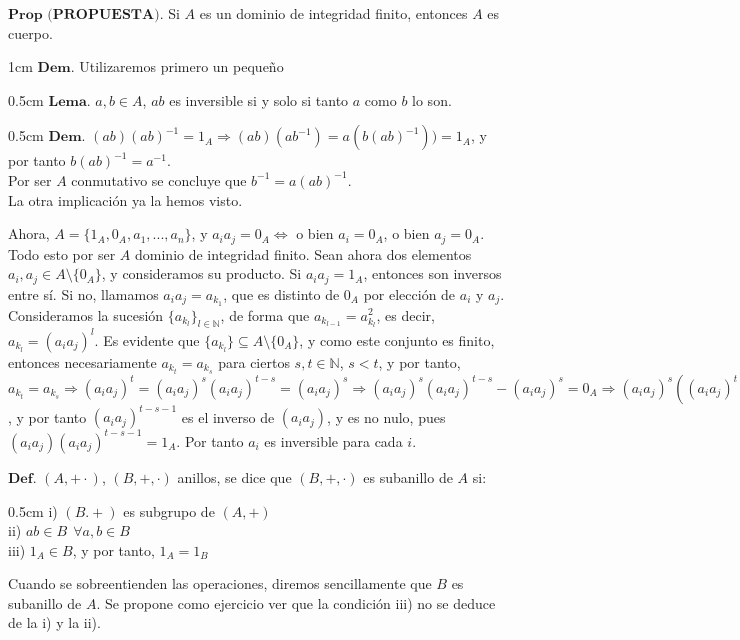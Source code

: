 \documentclass{article}
\begin{document}
$\textbf{Prop (PROPUESTA).}$ Si $A$ es un dominio de integridad finito, entonces $A$ es cuerpo.
\begin{adjustwidth}{1cm}{}
    $\textbf{Dem.}$
    Utilizaremos primero un pequeño
    \begin{adjustwidth}{0.5cm}{}
        $\textbf{Lema.}$ $a, b\in A$, $ab$ es inversible si y solo si tanto $a$ como $b$ lo son.
        \begin{adjustwidth}{0.5cm}{}
            $\textbf{Dem.}$ $(ab)(ab)^{-1} = 1_A \Longrightarrow (ab)(ab^{-1}) = a(b(ab)^{-1})) = 1_A$, y por tanto $b(ab)^{-1} = a^{-1}$.\\
            Por ser $A$ conmutativo se concluye que $b^{-1} = a(ab)^{-1}$.\\
            La otra implicación ya la hemos visto.
        \end{adjustwidth}
    \end{adjustwidth}

    Ahora, $A = \{1_A, 0_A, a_1, ..., a_n \} $, y $a_ia_j = 0_A  \Longleftrightarrow $ o bien $a_i = 0_A$, o bien $a_j = 0_A$. Todo esto por ser $A$ dominio de integridad finito. Sean ahora dos elementos $a_i, a_j \in A\setminus \{0_A\}$, y consideramos su producto. Si $a_ia_j = 1_A$, entonces son inversos entre sí. Si no, llamamos $a_ia_j = a_{k_1}$, que es distinto de $0_A$ por elección de $a_i$ y $a_j$. Consideramos la sucesión $\{ a_{k_l} \}_{l \in \mathbb{N}}$, de forma que $a_{k_{l-1}} = a_{k_l}^2$, es decir, $a_{k_l} = (a_ia_j)^l$. Es evidente que $\{ a_{k_l} \} \subseteq A\setminus \{0_A\}$, y como este conjunto es finito, entonces necesariamente $a_{k_t} = a_{k_s}$ para ciertos $s,t \in \mathbb{N}$, $s<t$, y por tanto, $a_{k_t} = a_{k_s} \Longrightarrow (a_ia_j)^t = (a_ia_j)^s(a_ia_j)^{t-s} = (a_ia_j)^s \Longrightarrow (a_ia_j)^s(a_ia_j)^{t-s} - (a_ia_j)^s = 0_A \Longrightarrow (a_ia_j)^s((a_ia_j)^{t-s} - 1_A) = 0_A \Longrightarrow (a_ia_j)^{t-s} - 1_A = 0_A \Longrightarrow (a_ia_j)^{t-s} = 1_A \Longrightarrow (a_ia_j)(a_ia_j)^{t-s-1} = 1_A$, y por tanto $(a_ia_j)^{t-s-1}$ es el inverso de $(a_ia_j)$, y es no nulo, pues $(a_ia_j)(a_ia_j)^{t-s-1} = 1_A$. Por tanto $a_i$ es inversible para cada $i$.\\

\end{adjustwidth}

$\textbf{Def.}$ $(A, + \cdot)$, $(B, + , \cdot)$ anillos, se dice que $(B, + , \cdot)$ es subanillo de $A$ si:
\begin{adjustwidth}{0.5cm}{}
    i) $(B. +)$ es subgrupo de $(A, +)$\\
    ii) $ab\in B \ \ \forall a,b \in B$\\
    iii) $1_A \in B$, y por tanto, $1_A = 1_B$
\end{adjustwidth}
Cuando se sobreentienden las operaciones, diremos sencillamente que $B$ es subanillo de $A$. Se propone como ejercicio ver que la condición iii) no se deduce de la i) y la ii).\\
\end{document}
